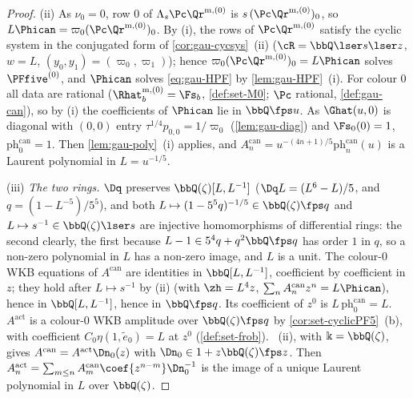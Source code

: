 \begin{proof}
(ii) As $\nu_0=0$, row $0$ of $\Lambda_s\Pc\Qr^{\mathrm m,(0)}$ is $s\,(\Pc\Qr^{\mathrm m,(0)})_0$, so $L\Phican=\varpi_0(\Pc\Qr^{\mathrm m,(0)})_0$. By (i), the rows of $\Pc\Qr^{\mathrm m,(0)}$ satisfy the cyclic system in the conjugated form of \cref{cor:gau-cycsys}~(ii) ($\cR=\bbQ\lser s\lser z$, $w=L$, $(y_0,y_1)=(\varpi_0,\varpi_1)$); hence $\varpi_0(\Pc\Qr^{\mathrm m,(0)})_0=L\Phican$ solves $\PFfive^{(0)}$, and $\Phican$ solves \eqref{eq:gau-HPF} by \cref{lem:gau-HPF}~(i). For colour $0$ all data are rational ($\Rhat^{\mathrm m,(0)}_b=\Fs_b$, \cref{def:set-M0}; $\Pc$ rational, \cref{def:gau-can}), so by (i) the coefficients of $\Phican$ lie in $\bbQ\fps u$. As $\Ghat(u,0)$ is diagonal with $(0,0)$ entry $\tau^{1/4}p_{0,0}=1/\varpi_0$ (\cref{lem:gau-diag}) and $\Fs_0(0)=1$, $\mathrm{ph}^{\mathrm{can}}_0=1$. Then \cref{lem:gau-poly}~(i) applies, and $A^{\mathrm{can}}_n=u^{-(4n+1)/5}\mathrm{ph}^{\mathrm{can}}_n(u)$ is a Laurent polynomial in $L=u^{-1/5}$.

(iii) \emph{The two rings.} $\Dq$ preserves $\bbQ(\zeta)[L,L^{-1}]$ ($\Dq L=(L^6-L)/5$, and $q=(1-L^{-5})/5^5$), and both $L\mapsto(1-5^5q)^{-1/5}\in\bbQ(\zeta)\fps q$ and $L\mapsto s^{-1}\in\bbQ(\zeta)\lser s$ are injective homomorphisms of differential rings: the second clearly, the first because $L-1\in5^4q+q^2\bbQ\fps q$ has order $1$ in $q$, so a non-zero polynomial in $L$ has a non-zero image, and $L$ is a unit. The colour-$0$ WKB equations of $A^{\mathrm{can}}$ are identities in $\bbQ[L,L^{-1}]$, coefficient by coefficient in $z$; they hold after $L\mapsto s^{-1}$ by (ii) (with $\zh=L^4z$, $\sum_nA^{\mathrm{can}}_nz^n=L\Phican$), hence in $\bbQ[L,L^{-1}]$, hence in $\bbQ\fps q$. Its coefficient of $z^0$ is $L\,\mathrm{ph}^{\mathrm{can}}_0=L$. $A^{\mathrm{act}}$ is a colour-$0$ WKB amplitude over $\bbQ(\zeta)\fps q$ by \cref{cor:set-cyclicPF5}~(b), with coefficient $C_0\eta(1,\tilde e_0)=L$ at $z^0$ (\cref{def:set-frob}). ~(ii), with $\Bbbk=\bbQ(\zeta)$, gives $A^{\mathrm{can}}=A^{\mathrm{act}}\Dn_0(z)$ with $\Dn_0\in1+z\bbQ(\zeta)\fps z$. Then $A^{\mathrm{act}}_n=\sum_{m\leq n}A^{\mathrm{can}}_m\coef{z^{n-m}}\Dn_0^{-1}$ is the image of a unique Laurent polynomial in $L$ over $\bbQ(\zeta)$.


\end{proof}
